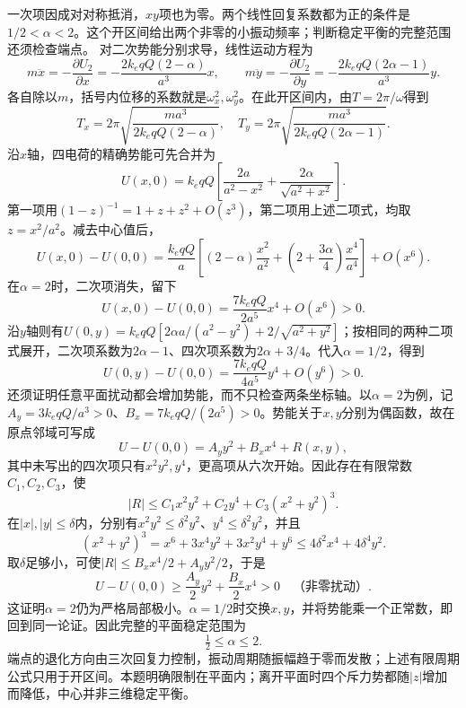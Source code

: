 \begin{solution}
一次项因成对对称抵消，$xy$项也为零。两个线性回复系数都为正的条件是$1/2<\alpha<2$。这个开区间给出两个非零的小振动频率；判断稳定平衡的完整范围还须检查端点。
对二次势能分别求导，线性运动方程为
\[
m\ddot x=-\frac{\partial U_2}{\partial x}
=-\frac{2k_eqQ(2-\alpha)}{a^3}x,\qquad
m\ddot y=-\frac{\partial U_2}{\partial y}
=-\frac{2k_eqQ(2\alpha-1)}{a^3}y.
\]
各自除以$m$，括号内位移的系数就是$\omega_x^2,\omega_y^2$。在此开区间内，由$T=2\pi/\omega$得到
\[
 \boxed{T_x=2\pi\sqrt{\frac{ma^3}{2k_eqQ(2-\alpha)}},\quad
 T_y=2\pi\sqrt{\frac{ma^3}{2k_eqQ(2\alpha-1)}}}.
\]
沿$x$轴，四电荷的精确势能可先合并为
\[
U(x,0)=k_eqQ\left[\frac{2a}{a^2-x^2}
+\frac{2\alpha}{\sqrt{a^2+x^2}}\right].
\]
第一项用$(1-z)^{-1}=1+z+z^2+O(z^3)$，第二项用上述二项式，均取$z=x^2/a^2$。减去中心值后，
\[
U(x,0)-U(0,0)=\frac{k_eqQ}{a}
\left[(2-\alpha)\frac{x^2}{a^2}
+\left(2+\frac{3\alpha}{4}\right)\frac{x^4}{a^4}\right]+O(x^6).
\]
在$\alpha=2$时，二次项消失，留下
\[
 U(x,0)-U(0,0)=\frac{7k_eqQ}{2a^5}x^4+O(x^6)>0.
\]
沿$y$轴则有$U(0,y)=k_eqQ[2\alpha a/(a^2-y^2)+2/\sqrt{a^2+y^2}]$；按相同的两种二项式展开，二次项系数为$2\alpha-1$、四次项系数为$2\alpha+3/4$。代入$\alpha=1/2$，得到
\[
 U(0,y)-U(0,0)=\frac{7k_eqQ}{4a^5}y^4+O(y^6)>0.
\]
还须证明任意平面扰动都会增加势能，而不只检查两条坐标轴。以$\alpha=2$为例，记$A_y=3k_eqQ/a^3>0$、$B_x=7k_eqQ/(2a^5)>0$。势能关于$x,y$分别为偶函数，故在原点邻域可写成
\[
U-U(0,0)=A_y y^2+B_x x^4+R(x,y),
\]
其中未写出的四次项只有$x^2y^2,y^4$，更高项从六次开始。因此存在有限常数$C_1,C_2,C_3$，使
\[
|R|\le C_1x^2y^2+C_2y^4+C_3(x^2+y^2)^3.
\]
在$|x|,|y|\le\delta$内，分别有$x^2y^2\le\delta^2y^2$、$y^4\le\delta^2y^2$，并且
\[
(x^2+y^2)^3=x^6+3x^4y^2+3x^2y^4+y^6
\le4\delta^2x^4+4\delta^4y^2.
\]
取$\delta$足够小，可使$|R|\le B_xx^4/2+A_yy^2/2$，于是
\[
U-U(0,0)\ge\frac{A_y}{2}y^2+\frac{B_x}{2}x^4>0
\quad\text{（非零扰动）}.
\]
这证明$\alpha=2$仍为严格局部极小。$\alpha=1/2$时交换$x,y$，并将势能乘一个正常数，即回到同一论证。因此完整的平面稳定范围为
\[
 \boxed{\tfrac12\le\alpha\le2}.
\]
端点的退化方向由三次回复力控制，振动周期随振幅趋于零而发散；上述有限周期公式只用于开区间。本题明确限制在平面内；离开平面时四个斥力势都随$|z|$增加而降低，中心并非三维稳定平衡。


\end{solution}



